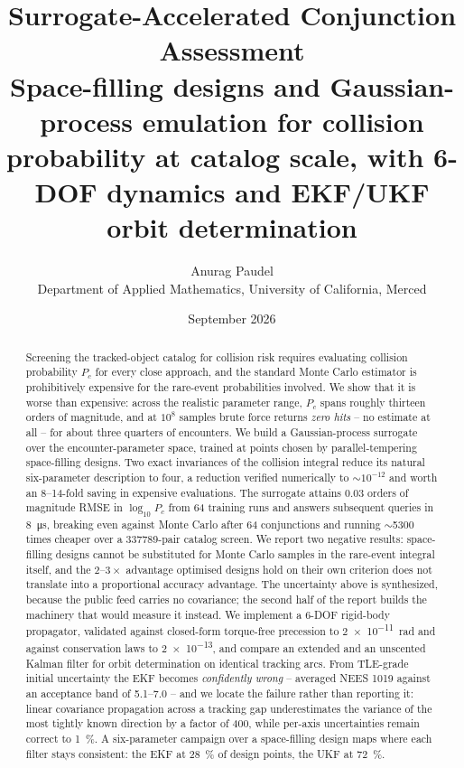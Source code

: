 \documentclass[11pt]{article}
\title{\textbf{Surrogate-Accelerated Conjunction Assessment}\\[2pt]
\large Space-filling designs and Gaussian-process emulation for collision
probability at catalog scale, with 6-DOF dynamics and EKF/UKF orbit
determination}
\author{Anurag Paudel\\
\small Department of Applied Mathematics, University of California, Merced}
\date{September 2026}
\newcommand{\Pc}{P_c}
\begin{document}
\maketitle

\begin{abstract}
Screening the tracked-object catalog for collision risk requires evaluating
collision probability $\Pc$ for every close approach, and the standard
Monte Carlo estimator is prohibitively expensive for the rare-event
probabilities involved. We show that it is worse than expensive: across the
realistic parameter range, $\Pc$ spans roughly thirteen orders of magnitude,
and at $10^{8}$ samples brute force returns \emph{zero hits} -- no estimate
at all -- for about three quarters of encounters. We build a Gaussian-process
surrogate over the encounter-parameter space, trained at points chosen by
parallel-tempering space-filling designs. Two exact invariances of the
collision integral reduce its natural six-parameter description to four, a
reduction verified numerically to $\sim10^{-12}$ and worth an
\numrange{8}{14}-fold saving in expensive evaluations. The surrogate attains
\num{0.03} orders of magnitude RMSE in $\log_{10}\Pc$ from 64 training runs
and answers subsequent queries in \SI{8}{\micro\second}, breaking even
against Monte Carlo after 64 conjunctions and running
$\sim$\num{5300} times cheaper over a \num{337789}-pair catalog screen. We
report two negative results: space-filling designs cannot be substituted for
Monte Carlo samples in the rare-event integral itself, and the
$2$--$3\times$ advantage optimised designs hold on their own criterion does
not translate into a proportional accuracy advantage.
The uncertainty above is synthesized, because the public feed carries no
covariance; the second half of the report builds the machinery that would
measure it instead. We implement a 6-DOF rigid-body propagator, validated
against closed-form torque-free precession to \SI{2e-11}{\radian} and
against conservation laws to \num{2e-13}, and compare an extended and an
unscented Kalman filter for orbit determination on identical tracking
arcs. From TLE-grade initial uncertainty the EKF becomes
\emph{confidently wrong} -- averaged NEES \num{1019} against an acceptance
band of \numrange{5.1}{7.0} -- and we locate the failure rather than
reporting it: linear covariance propagation across a tracking gap
underestimates the variance of the most tightly known direction by a factor
of \num{400}, while per-axis uncertainties remain correct to
\SI{1}{\percent}. A six-parameter campaign over a space-filling design maps
where each filter stays consistent: the EKF at \SI{28}{\percent} of design
points, the UKF at \SI{72}{\percent}.
\end{abstract}
\end{document}
